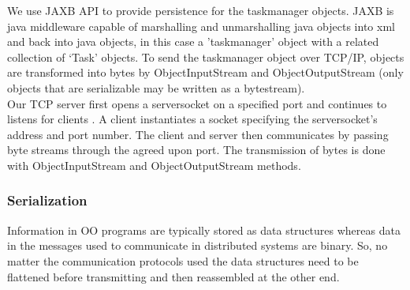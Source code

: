 We use JAXB API to provide persistence for the taskmanager objects. JAXB is java middleware capable of marshalling and unmarshalling java objects into xml and back into java objects, in this case a 'taskmanager' object with a related collection of ‘Task’ objects. To send the taskmanager object over TCP/IP, objects are transformed into bytes by ObjectInputStream and ObjectOutputStream (only objects that are serializable may be written as a bytestream).   \\ 

Our TCP server first opens a serversocket on a specified port and continues to listens for clients . A client instantiates a socket specifying the serversocket's address and port number. The client and server then communicates by passing byte streams through the agreed upon port. The transmission of bytes is done with ObjectInputStream and ObjectOutputStream methods.  \\

\subsubsection{Serialization}
Information in OO programs are typically stored as data structures whereas data in the messages used to communicate in distributed systems are binary. So, no matter the communication protocols used the data structures need to be flattened before transmitting and then reassembled at the other end.



